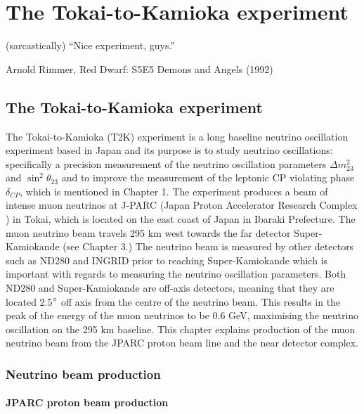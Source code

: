 \chapter{The Tokai-to-Kamioka experiment}
\epigraph{(sarcastically) ``Nice experiment, guys.''}{Arnold Rimmer, Red Dwarf: S5E5 Demons and Angels (1992) }
\label{chp:t2kdetector}

\section{The Tokai-to-Kamioka experiment}
The Tokai-to-Kamioka (T2K) experiment \cite{KANEYUKI2005178} is a long baseline neutrino oscillation experiment based in Japan and its purpose is to study neutrino oscillations: specifically a precision measurement of the neutrino oscillation parameters $\Delta m_{23}^{2}$ and $\sin ^{2} \theta_{23}$ and to improve the measurement of the leptonic CP violating phase $\delta_{CP}$, which is mentioned in Chapter 1. The experiment produces a beam of intense muon neutrinos at J-PARC (Japan Proton Accelerator Research Complex \cite{nagamiya2012introduction}) in Tokai, which is located on the east coast of Japan in Ibaraki Prefecture. The muon neutrino beam travels 295 km west towards the far detector Super-Kamiokande (see Chapter 3.)  The neutrino beam is measured by other detectors such as ND280 \cite{kudenko2009near} and INGRID \cite{abe2012measurements} prior to reaching Super-Kamiokande which is important with regards to measuring the neutrino oscillation parameters. Both ND280 and Super-Kamiokande are off-axis detectors, meaning that they are located 2.5$\degree$ off axis from the centre of the neutrino beam. This results in the peak of the energy of the muon neutrinos to be 0.6 GeV, maximising the neutrino oscillation on the 295 km baseline. This chapter explains production of the muon neutrino beam from the JPARC proton beam line and the near detector complex.


\subsection{Neutrino beam production}

\subsubsection{JPARC proton beam production}


